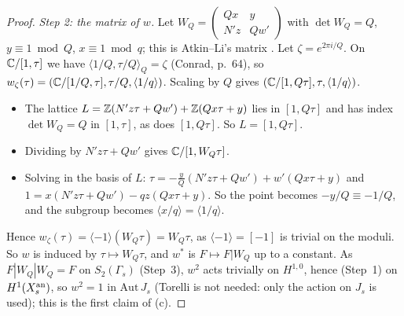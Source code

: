 \begin{proof}
\emph{Step 2: the matrix of $w$.} Let $W_Q=\left(\begin{smallmatrix}Qx&y\\N'z&Qw'\end{smallmatrix}\right)$ with $\det W_Q=Q$, $y\equiv1\bmod Q$, $x\equiv1\bmod q$; this is Atkin--Li's matrix
.
Let $\zeta=e^{2\pi i/Q}$. On $\mathbb{C}/[1,\tau]$ we have $\langle1/Q,\tau/Q\rangle_Q=\zeta$ (Conrad, p.~64), so $w_\zeta(\tau)=(\mathbb{C}/[1/Q,\tau],\tau/Q,\langle1/q\rangle)$.
Scaling by $Q$ gives $(\mathbb{C}/[1,Q\tau],\tau,\langle1/q\rangle)$.
\begin{itemize}
\item The lattice $L=\mathbb{Z}(N'z\tau+Qw')+\mathbb{Z}(Qx\tau+y)$ lies in $[1,Q\tau]$ and has index $\det W_Q=Q$ in $[1,\tau]$, as does $[1,Q\tau]$. So $L=[1,Q\tau]$.
\item Dividing by $N'z\tau+Qw'$ gives $\mathbb{C}/[1,W_Q\tau]$.
\item Solving in the basis of $L$: $\tau=-\tfrac yQ(N'z\tau+Qw')+w'(Qx\tau+y)$ and $1=x(N'z\tau+Qw')-qz(Qx\tau+y)$. So the point becomes $-y/Q\equiv-1/Q$, and the subgroup
  becomes $\langle x/q\rangle=\langle1/q\rangle$.
\end{itemize}
Hence $w_\zeta(\tau)=\langle-1\rangle(W_Q\tau)=W_Q\tau$, as $\langle-1\rangle=[-1]$ is trivial on the moduli. So $w$ is induced by $\tau\mapsto W_Q\tau$, and $w^*$ is $F\mapsto F|W_Q$ up to a constant. As $F|W_Q|W_Q=F$ on $S_2(\Gamma_s)$ (Step~3), $w^2$ acts trivially on $H^{1,0}$, hence (Step~1) on $H^1(X_s^{\rm an})$, so
$w^2=1$ in $\mathrm{Aut}\,J_s$ (Torelli is not needed: only the action on $J_s$ is used); this is the first claim of (c).


\end{proof}
